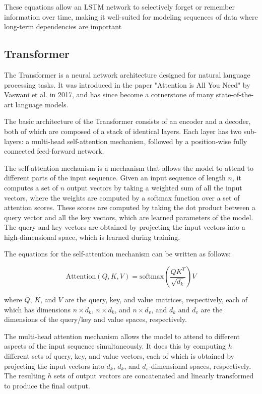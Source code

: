 \documentclass[a4paper]{sapthesis}
\begin{document}
These equations allow an LSTM network to selectively forget or remember
 information over time, making it well-suited for modeling sequences of
  data where long-term dependencies are important

\subsection{Transformer}
The Transformer is a neural network architecture designed for natural
 language processing tasks. It was introduced in the paper "Attention
  is All You Need" by Vaswani et al. in 2017\cite{attention}, and has since become 
  a cornerstone of many state-of-the-art language models.\newline

The basic architecture of the Transformer consists of an encoder and a 
decoder, both of which are composed of a stack of identical layers. Each 
layer has two sub-layers: a multi-head self-attention mechanism, followed 
by a position-wise fully connected feed-forward network.\newline

The self-attention mechanism is a mechanism that allows the model to 
attend to different parts of the input sequence. Given an input sequence
 of length $n$, it computes a set of $n$ output vectors by taking a 
 weighted sum of all the input vectors, where the weights are computed 
 by a softmax function over a set of attention scores. These scores are
  computed by taking the dot product between a query vector and all the 
  key vectors, which are learned parameters of the model. The query and
   key vectors are obtained by projecting the input vectors into a 
high-dimensional space, which is learned during training.\newline

The equations for the self-attention mechanism can be written as follows:

$$\text{Attention}(Q,K,V) = \text{softmax}\left(\frac{QK^T}{\sqrt{d_k}}\right)V$$

where $Q$, $K$, and $V$ are the query, key, and value matrices, 
respectively, each of which has dimensions $n\times d_k$, $n\times d_k$,
 and $n\times d_v$, and $d_k$ and $d_v$ are the dimensions of the 
 query/key and value spaces, respectively.\newline

The multi-head attention mechanism allows the model to attend to different
 aspects of the input sequence simultaneously. It does this by 
computing $h$ different sets of query, key, and value vectors,
each of which is obtained by projecting the input vectors into
$d_k$, $d_k$, and $d_v$-dimensional spaces, respectively. 
The resulting $h$ sets of output vectors are concatenated
 and linearly transformed to produce the final output.\newline
\end{document}

